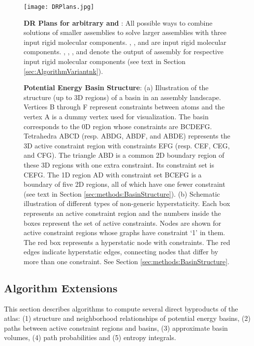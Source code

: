 \documentclass[]{article}
\newcommand{\rmc}{rigid molecular component}
\begin{document}
\begin{figure}[htpb]
\centering
\texttt{[image: DRPlans.jpg]}
\caption{\scriptsize \textbf{DR Plans for arbitrary  and }: 
All possible ways to combine
solutions of smaller assemblies to solve larger assemblies with three input
\rmc s. , , and  are input \rmc s. , , , and
 denote the output of assembly for respective input \rmc s
(see text in Section \ref{sec:AlgorithmVariantnk}).}
\label{fig:DRPlans}
\end{figure}

\begin{figure*}[htpb]
\centering
{}
\caption{\scriptsize \textbf{Potential Energy Basin Structure}:
(a) Illustration of the structure (up to 3D regions) of a basin in an assembly
landscape.  Vertices B through F represent constraints between atoms
and the vertex A is a dummy vertex used for visualization. The basin
corresponds to the 0D region whose constraints are BCDEFG.  Tetrahedra
ABCD (resp. ABDG, ABDF, and ABDE) represents the 3D active
constraint region with constraints EFG (resp.  CEF, CEG, and CFG).  The
triangle ABD is a common 2D boundary region of these 3D regions with
one extra constraint. Its constraint set is CEFG. The 1D region AD with
constraint set BCEFG is a boundary of five 2D regions, all of which
have one fewer constraint (see text in Section \ref{sec:methods:BasinStructure}).
(b) Schematic illustration of different types of non-generic hyperstaticity.
Each box represents an active constraint region and the numbers inside the
boxes represent the set of active constraints. Nodes are shown for
active constraint regions whose graphs have constraint `1' in them.
The red box represents a hyperstatic node with  constraints.
The red edges indicate hyperstatic edges, connecting nodes
that differ by more than one constraint.
See Section \ref{sec:methods:BasinStructure}.
}
\label{fig:Basin}
\end{figure*}



\subsection{Algorithm Extensions}
\label{sec:methods:immediateResults}
This section describes algorithms to compute several direct byproducts of the atlas:
(1) structure and neighborhood relationships of potential energy basins, 
(2) paths between active constraint regions and basins,
(3) approximate basin volumes, (4) path probabilities 
and (5) entropy integrals.
\end{document}
